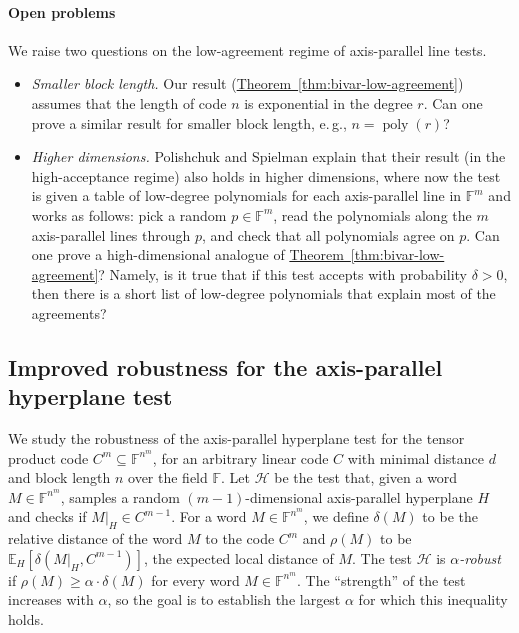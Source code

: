 \documentclass[11pt]{article}
\numberwithin{equation}{section}
\theoremstyle{definition}
\theoremstyle{plain}
\newcommand{\eg}{e.\,g.}
\newcommand{\expref}[2]{\hyperref[#2]{#1~\ref{#2}}}
\theoremstyle{plain}
\newcommand{\colored}{}
\newcommand{\reldist}{\colored{\delta}}
\newcommand{\robust}{\colored{\rho}} %
\newcommand{\tester}{\colored{\mathcal H}} %
\newcommand{\plane}{{\colored{H}}} %
\newcommand{\codedist}{\colored{d}} %
\newcommand{\blocklength}{\colored{n}} %
\newcommand{\testerinput}{\colored{M}} %
\newcommand{\Field}{\colored{\mathbb F}}
\newcommand{\degree}{\colored{r}}
\newcommand{\prox}{\colored{\delta}}
\newcommand{\poly}{\operatorname{poly}}
\newcommand{\parhead}{\paragraph}
\begin{document}
\parhead{Open problems}

We raise two questions on the low-agreement regime of axis-parallel line tests.
\begin{itemize}

  \item \emph{Smaller block length.}
  Our result (\expref{Theorem}{thm:bivar-low-agreement}) assumes that the length of code $\blocklength$ is exponential in the degree $\degree$. Can one prove a similar result for smaller block length, \eg, $\blocklength=\poly(\degree)$?

  \item \emph{Higher dimensions.}
  Polishchuk and Spielman \cite{PolishchukS94} explain that their result (in the high-acceptance regime) also holds in higher dimensions, where now the test is given a table of low-degree polynomials for each axis-parallel line in $\Field^m$ and works as follows: pick a random $p \in \Field^m$, read the polynomials along the $m$ axis-parallel lines through $p$, and check that all polynomials agree on $p$. Can one prove a high-dimensional analogue of \expref{Theorem}{thm:bivar-low-agreement}? Namely, is it true that if this test accepts with probability $\prox > 0$, then there is a short list of low-degree polynomials that explain most of the agreements?

\end{itemize}
%
%
\subsection{Improved robustness for the axis-parallel hyperplane test}
\label{sec:result-robustness}

We study the robustness of the axis-parallel hyperplane test for the tensor product code $C^{m} \subseteq \Field^{\blocklength^{m}}$, for an arbitrary linear code $C$ with minimal distance $\codedist$ and block length $\blocklength$ over the field $\Field$. Let $\tester$ be the test that, given a word $\testerinput \in \Field^{\blocklength^{m}}$, samples a random $(m-1)$-dimensional axis-parallel hyperplane $\plane$ and checks if $\testerinput \vert_{\plane} \in C^{m-1}$. For a word $\testerinput \in \Field^{\blocklength^{m}}$, we define $\reldist(\testerinput)$ to be the relative distance of the word $\testerinput$ to the code $C^{m}$ and $\robust(\testerinput)$ to be $\mathbb E_{\plane} [\reldist(\testerinput \vert_{\plane}, C^{m-1})]$, the expected local distance of $\testerinput$. The test $\tester$ is \emph{$\alpha$-robust} if $\robust(\testerinput) \geq \alpha \cdot \reldist(\testerinput)$ for every word $\testerinput \in \Field^{\blocklength^{m}}$. The ``strength'' of the test increases with $\alpha$, so the goal is to establish the largest $\alpha$ for which this inequality holds.
\end{document}
